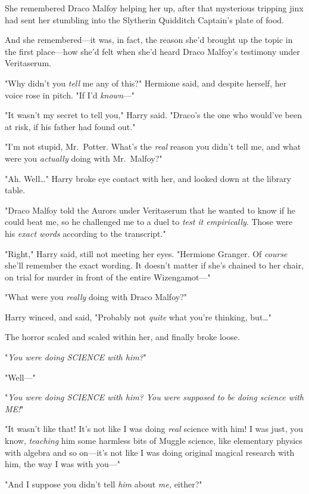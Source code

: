 She remembered Draco Malfoy helping her up, after that mysterious tripping jinx 
had sent her stumbling into the Slytherin Quidditch Captain's plate of food.

And she remembered---it was, in fact, the reason she'd brought up the topic in 
the first place---how she'd felt when she'd heard Draco Malfoy's testimony 
under Veritaserum.

"Why didn't you \emph{tell} me any of this?" Hermione said, and despite 
herself, her voice rose in pitch. "If I'd \emph{known}---"

"It wasn't my secret to tell you," Harry said. "Draco's the one who would've 
been at risk, if his father had found out."

"I'm not stupid, Mr.~Potter. What's the \emph{real} reason you didn't tell me, 
and what were you \emph{actually} doing with Mr.~Malfoy?"

"Ah. Well{\ldots}" Harry broke eye contact with her, and looked down at the 
library table.

"Draco Malfoy told the Aurors under Veritaserum that he wanted to know if he 
could beat me, so he challenged me to a duel to \emph{test it empirically}. 
Those were his \emph{exact words} according to the transcript."

"Right," Harry said, still not meeting her eyes. "Hermione Granger. Of 
\emph{course} she'll remember the exact wording. It doesn't matter if she's 
chained to her chair, on trial for murder in front of the entire Wizengamot---"

"What were you \emph{really} doing with Draco Malfoy?"

Harry winced, and said, "Probably not \emph{quite} what you're thinking, 
but{\ldots}"

The horror scaled and scaled within her, and finally broke loose.

"\emph{You were doing SCIENCE with him?}"

"Well---"

"\emph{You were doing SCIENCE with him? You were supposed to be doing science 
with ME!}"

"It wasn't like that! It's not like I was doing \emph{real} science with him! I 
was just, you know, \emph{teaching} him some harmless bits of Muggle science, 
like elementary physics with algebra and so on---it's not like I was doing 
original magical research with him, the way I was with you---"

"And I suppose you didn't tell \emph{him} about \emph{me,} either?"

